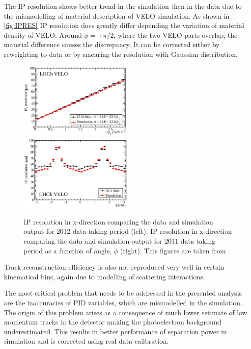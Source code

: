 The \Gls{IP} resolution shows better trend in the simulation then in the data due to the mismodelling of material description of \Gls{VELO} simulation. As shown in \autoref{fig:IPRES} \Gls{IP} resolution does greatly differ depending the variation of material density of \Gls{VELO}. Around $\phi=\pm\pi/2$, where the two \Gls{VELO} parts overlap, the material difference causes the discrepancy. It can be corrected either by reweighting to data or by smearing the resolution with Gaussian distribution.

\begin{figure}[!h]
	\centering
	\includegraphics[width = 0.5\textwidth]{figs/detector/IPres.eps}%
	\includegraphics[width = 0.5\textwidth]{figs/detector/IPresAngle.eps}%
	\caption{\Gls{IP} resolution in x-direction comparing the data and simulation output for 2012 data-taking period (left). \Gls{IP} resolution in x-direction comparing the data and simulation output for 2011 data-taking period as a function of angle, $\phi$ (right). This figures are taken from \cite{LHCbVELOGroup:2014uea}. }  
	\label{fig:IPRES}
\end{figure}


Track reconstruction efficiency is also not reproduced very well in certain kinematical bins, again due to modelling of scattering interactions.

The most critical problem that needs to be addressed in the presented analysis are the inaccuracies of \Gls{PID} variables, which are mismodelled in the simulation. The origin of this problem arises as a consequence of much lower estimate of low momentum tracks in the detector making the photoelectron background underestimated. This results in better performance of separation power in simulation and is corrected using real data calibration.


